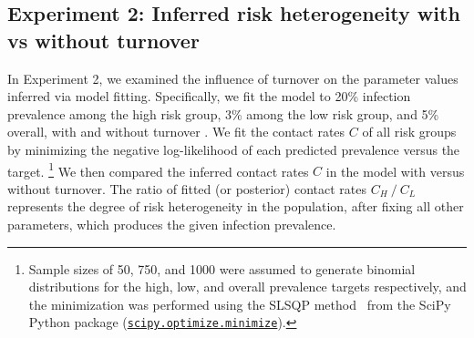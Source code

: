 \subsection{Experiment 2: Inferred risk heterogeneity with vs without turnover}
\label{ss:exp-infer}
In Experiment 2, we examined the influence of turnover on
the parameter values inferred via model fitting.
Specifically, we fit the model to
20\% infection prevalence among the high risk group,
3\% among the low risk group,
and 5\% overall,
with and without turnover .
We fit the contact rates $C$ of all risk groups
by minimizing the negative log-likelihood of each predicted prevalence versus the target.%
\footnote{Sample sizes of 50, 750, and 1000 were assumed to generate binomial distributions
  for the high, low, and overall prevalence targets respectively,
  and the minimization was performed using
  the SLSQP method~\citep{Kraft1988} from the SciPy Python package
  (\href{https://docs.scipy.org/doc/scipy/reference/generated/scipy.optimize.minimize.html}
        {\texttt{scipy.optimize.minimize}}).}
We then compared the inferred contact rates $C$
in the model with versus without turnover.
The ratio of fitted (or posterior) contact rates $C_H~/~C_L$
represents the degree of risk heterogeneity in the population,
after fixing all other parameters,
which produces the given infection prevalence.
